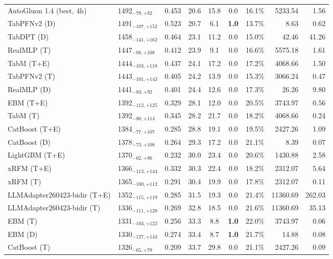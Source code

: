 \begin{tabular}{llcccccrr}
AutoGluon 1.4 (best, 4h) & 1492${}_{-79,+82}$ & 0.453 & 20.6 & 15.8 & 0.0 & 16.1\% & 5233.54 & 1.56 \\
TabPFNv2 (D) & 1491${}_{-107,+152}$ & 0.523 & 20.7 & 6.1 & \textcolor{bronze}{\textbf{1.0}} & 13.7\% & 8.63 & 0.62 \\
TabDPT (D) & 1458${}_{-141,+162}$ & 0.464 & 23.1 & 11.2 & 0.0 & 15.0\% & 42.46 & 41.26 \\
RealMLP (T) & 1447${}_{-88,+108}$ & 0.412 & 23.9 & 9.1 & 0.0 & 16.6\% & 5575.18 & 1.61 \\
TabM (T+E) & 1444${}_{-103,+118}$ & 0.437 & 24.1 & 17.2 & 0.0 & 17.2\% & 4068.66 & 1.50 \\
TabPFNv2 (T) & 1443${}_{-101,+143}$ & 0.405 & 24.2 & 13.9 & 0.0 & 15.3\% & 3066.24 & 0.47 \\
RealMLP (D) & 1441${}_{-83,+92}$ & 0.401 & 24.4 & 12.6 & 0.0 & 17.3\% & 26.26 & 9.80 \\
EBM (T+E) & 1392${}_{-112,+125}$ & 0.329 & 28.1 & 12.0 & 0.0 & 20.5\% & 3743.97 & 0.56 \\
TabM (T) & 1392${}_{-80,+114}$ & 0.345 & 28.2 & 21.7 & 0.0 & 18.2\% & 4068.66 & 0.24 \\
CatBoost (T+E) & 1384${}_{-77,+107}$ & 0.285 & 28.8 & 19.1 & 0.0 & 19.5\% & 2427.26 & 1.09 \\
CatBoost (D) & 1378${}_{-73,+108}$ & 0.264 & 29.3 & 17.2 & 0.0 & 21.1\% & 8.39 & 0.07 \\
LightGBM (T+E) & 1370${}_{-62,+86}$ & 0.232 & 30.0 & 23.4 & 0.0 & 20.6\% & 1430.88 & 2.58 \\
xRFM (T+E) & 1366${}_{-113,+144}$ & 0.332 & 30.3 & 22.4 & 0.0 & 18.2\% & 2312.07 & 5.64 \\
xRFM (T) & 1365${}_{-100,+112}$ & 0.291 & 30.4 & 19.9 & 0.0 & 17.8\% & 2312.07 & 0.11 \\
LLMAdapter260423-bidir (T+E) & 1352${}_{-115,+119}$ & 0.285 & 31.5 & 19.3 & 0.0 & 21.4\% & 11360.69 & 262.03 \\
LLMAdapter260423-bidir (T) & 1336${}_{-111,+128}$ & 0.269 & 32.8 & 18.5 & 0.0 & 21.6\% & 11360.69 & 35.13 \\
EBM (T) & 1331${}_{-103,+122}$ & 0.256 & 33.3 & 8.8 & \textcolor{bronze}{\textbf{1.0}} & 22.0\% & 3743.97 & 0.06 \\
EBM (D) & 1330${}_{-127,+143}$ & 0.274 & 33.4 & 8.7 & \textcolor{bronze}{\textbf{1.0}} & 21.7\% & 14.88 & 0.08 \\
CatBoost (T) & 1326${}_{-65,+79}$ & 0.209 & 33.7 & 29.8 & 0.0 & 21.1\% & 2427.26 & 0.09 \\

\end{tabular}
